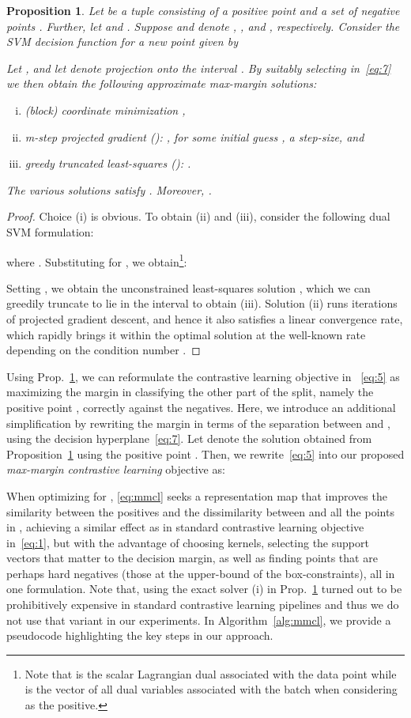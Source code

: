 \documentclass[letterpaper]{article} \usepackage{aaai22}  \usepackage{times}  \usepackage{helvet}  \usepackage{courier}  \usepackage[hyphens]{url}  \usepackage{graphicx} \urlstyle{rm} \def\UrlFont{\rm}  \usepackage{natbib}  \usepackage{caption} \DeclareCaptionStyle{ruled}{labelfont=normalfont,labelsep=colon,strut=off} \frenchspacing  \setlength{\pdfpagewidth}{8.5in}  \setlength{\pdfpageheight}{11in}
\newtheorem{prop}{Proposition}\newtheorem{lemma}{Lemma}
\begin{document}
\begin{prop}
  \label{prop:npt}
  Let  be a tuple consisting of a positive point  and a set of  negative points . Further, let  and . Suppose  and  denote , , and , respectively. Consider the SVM decision function for a new point  given by 
  
  Let , and let  denote projection onto the interval . By suitably selecting  in~\eqref{eq:7} we then obtain the following approximate max-margin solutions:
  \begin{enumerate}[(i)]
    \setlength{\itemsep}{0pt}
  \item (block) coordinate minimization  ,
  \item m-step projected gradient (): , for some initial guess ,  a step-size, and 
  \item greedy truncated least-squares (): .
  \end{enumerate}
  The various solutions satisfy . Moreover, .
\end{prop}
\begin{proof}
Choice (i) is obvious. To obtain (ii) and (iii), consider the following dual SVM formulation:


\noindent where . Substituting for , we obtain\footnote{Note that  is the scalar Lagrangian dual associated with the data point  while  is the vector of all dual variables associated with the batch  when considering  as the positive.}:

Setting , we obtain the unconstrained least-squares solution , which we can greedily truncate to lie in the interval  to obtain (iii). Solution (ii) runs  iterations of projected gradient descent, and hence it also satisfies a linear convergence rate, which rapidly brings it within the optimal solution  at the well-known rate depending on the condition number .
\end{proof}
Using Prop.~\ref{prop:npt}, we can reformulate the contrastive learning objective in ~\eqref{eq:5} as maximizing the margin in classifying the other part of the split, namely the positive point , correctly against the negatives. Here, we introduce an additional simplification by rewriting the margin in terms of the separation between  and , using the decision hyperplane~\eqref{eq:7}. Let  denote the solution obtained from Proposition~\ref{prop:npt} using the positive point . Then, we rewrite~\eqref{eq:5} into our proposed \emph{max-margin contrastive learning} objective as:


When optimizing for , \eqref{eq:mmcl} seeks a representation map  that improves the similarity between the positives  and the dissimilarity between  and all the points in , achieving a similar effect as in standard contrastive learning objective in~\eqref{eq:1}, but with the advantage of choosing kernels, selecting the support vectors that matter to the decision margin, as well as finding points that are perhaps hard negatives (those at the upper-bound of the box-constraints), all in one formulation. Note that, using the exact solver (i) in Prop.~\ref{prop:npt} turned out to be prohibitively expensive in standard contrastive learning pipelines and thus we do not use that variant in our experiments. In Algorithm~\ref{alg:mmcl}, we provide a pseudocode highlighting the key steps in our approach.
\end{document}
